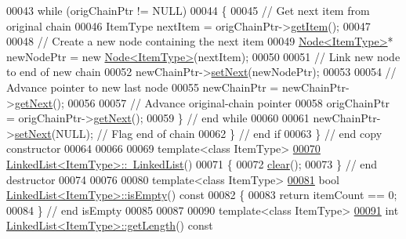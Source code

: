 \begin{DoxyCode}
00043       \textcolor{keywordflow}{while} (origChainPtr != NULL)
00044       \{
00045          \textcolor{comment}{// Get next item from original chain}
00046          ItemType nextItem = origChainPtr->\hyperlink{classNode_a6c08caef312b6f2f69b5e090cf047514}{getItem}();
00047          
00048          \textcolor{comment}{// Create a new node containing the next item }
00049          \hyperlink{classNode}{Node<ItemType>}* newNodePtr = \textcolor{keyword}{new} \hyperlink{classNode}{Node<ItemType>}(nextItem);  
00050          
00051          \textcolor{comment}{// Link new node to end of new chain}
00052          newChainPtr->\hyperlink{classNode_a01c1a66d4e39f5b149e090413deb4633}{setNext}(newNodePtr); 
00053          
00054          \textcolor{comment}{// Advance pointer to new last node      }
00055          newChainPtr = newChainPtr->\hyperlink{classNode_a3eb0c96e03a3fd46ea1cff4c305bbedd}{getNext}();
00056          
00057          \textcolor{comment}{// Advance original-chain pointer}
00058          origChainPtr = origChainPtr->\hyperlink{classNode_a3eb0c96e03a3fd46ea1cff4c305bbedd}{getNext}();
00059       \}  \textcolor{comment}{// end while}
00060       
00061       newChainPtr->\hyperlink{classNode_a01c1a66d4e39f5b149e090413deb4633}{setNext}(NULL);              \textcolor{comment}{// Flag end of chain}
00062    \}  \textcolor{comment}{// end if}
00063 \}  \textcolor{comment}{// end copy constructor}
00064 
00066 
00069 \textcolor{keyword}{template}<\textcolor{keyword}{class} ItemType>
\hyperlink{classLinkedList_a66aee17d756fe0e002375897383c180b}{00070} \hyperlink{classLinkedList_a66aee17d756fe0e002375897383c180b}{LinkedList<ItemType>::~LinkedList}()
00071 \{
00072    \hyperlink{classLinkedList_a7d1d9cf83eef67b6c4d700a3cc5970e1}{clear}();
00073 \}  \textcolor{comment}{// end destructor}
00074 
00076 
00080 \textcolor{keyword}{template}<\textcolor{keyword}{class} ItemType>
\hyperlink{classLinkedList_a008e916c3d51d28b4cc9c8cdf3e9d921}{00081} \textcolor{keywordtype}{bool} \hyperlink{classLinkedList_a008e916c3d51d28b4cc9c8cdf3e9d921}{LinkedList<ItemType>::isEmpty}()\textcolor{keyword}{ const}
00082 \textcolor{keyword}{}\{
00083    \textcolor{keywordflow}{return} itemCount == 0;
00084 \}  \textcolor{comment}{// end isEmpty}
00085 
00087 
00090 \textcolor{keyword}{template}<\textcolor{keyword}{class} ItemType>
\hyperlink{classLinkedList_a61d045ef6008b494a1a516ecc992c0e7}{00091} \textcolor{keywordtype}{int} \hyperlink{classLinkedList_a61d045ef6008b494a1a516ecc992c0e7}{LinkedList<ItemType>::getLength}()\textcolor{keyword}{ const}

\end{DoxyCode}

